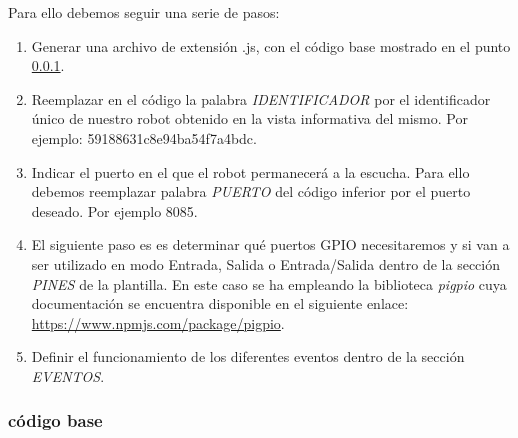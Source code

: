 Para ello debemos seguir una serie de pasos:\\

\begin{enumerate}
  \item Generar una archivo de extensión .js, con el código base mostrado en el punto \ref{codigo:base}.
  \item Reemplazar en el código la palabra \emph{IDENTIFICADOR} por el identificador único de nuestro robot obtenido en la vista informativa del mismo.
  Por ejemplo: 59188631c8e94ba54f7a4bdc.
  \item Indicar el puerto en el que el robot permanecerá a la escucha. Para ello debemos reemplazar palabra \emph{PUERTO} del código inferior por el puerto deseado. Por ejemplo 8085. 
  \item El siguiente paso es es determinar qué puertos GPIO necesitaremos y si van a ser utilizado en modo Entrada, Salida o Entrada/Salida dentro de la sección \emph{PINES} de la plantilla.
  En este caso se ha empleando la biblioteca \emph{pigpio} cuya documentación se encuentra disponible en el siguiente enlace: \url{https://www.npmjs.com/package/pigpio}.
  \item Definir el funcionamiento de los diferentes eventos dentro de la sección \emph{EVENTOS}.
\end{enumerate}


\subsubsection{código base}
\label{codigo:base}


